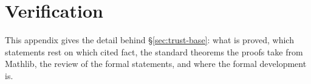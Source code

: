 \section{Verification}\label{app:verification}
This appendix gives the detail behind \S\ref{sec:trust-base}: what is proved, which statements rest
on which cited fact, the standard theorems the proofs take from Mathlib, the review of the formal
statements, and where the formal development is.

